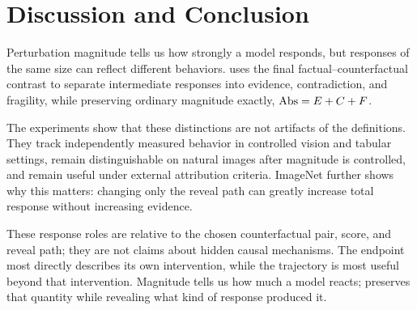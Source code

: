 \section{Discussion and Conclusion}
\label{sec:discussion}

Perturbation magnitude tells us how strongly a model responds, but responses
of the same size can reflect different behaviors. \decaf uses the final
factual--counterfactual contrast to separate intermediate responses into
evidence, contradiction, and fragility, while preserving ordinary magnitude
exactly, $\mathrm{Abs}=E+C+F$.

The experiments show that these distinctions are not artifacts of the
definitions. They track independently measured behavior in controlled vision
and tabular settings, remain distinguishable on natural images after magnitude
is controlled, and remain useful under external attribution criteria.
ImageNet further shows why this matters: changing only the reveal path can
greatly increase total response without increasing evidence.

These response roles are relative to the chosen counterfactual pair, score,
and reveal path; they are not claims about hidden causal mechanisms. The
endpoint most directly describes its own intervention, while the trajectory is
most useful beyond that intervention. Magnitude tells us how much a model
reacts; \decaf preserves that quantity while revealing what kind of response
produced it.